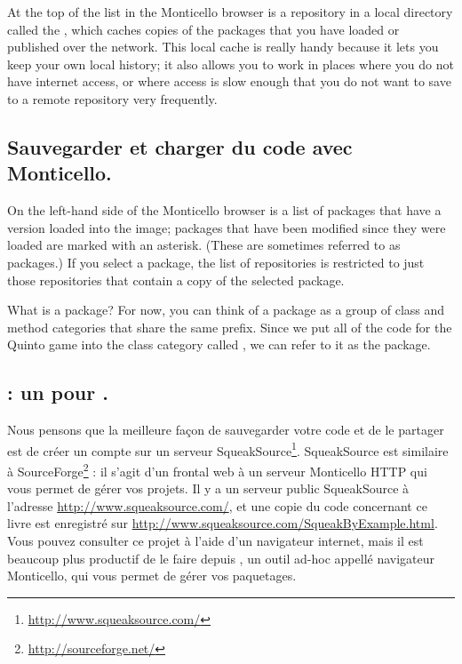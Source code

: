 \documentclass[a4paper,10pt,twoside]{book}
\begin{document}
At the top of the list in the Monticello browser is a repository in a local directory called the , which caches copies of the packages that you have loaded or published over the network. This local cache is really handy because it lets you keep your own local history; it also allows you to work in places where you do not have internet access, or where access is slow enough that you do not want to save to a remote repository very frequently.


\subsection{Sauvegarder et charger du code avec Monticello.}
On the left-hand side of the Monticello browser is a list of packages that have a version loaded into the image; packages that have been modified since they were loaded are marked with an asterisk.  (These are sometimes referred to as  packages.)  If you select a package, the list of repositories is restricted to just those repositories that contain a copy of the selected package.

What is a package?  For now, you can think of a package as a group of  class and method categories that share the same prefix.  Since we put all of the code for the Quinto game into the class category called , we can refer to it as the  package.


\subsection{: un  pour \squeak.} 
Nous pensons que la meilleure façon de sauvegarder votre code et de le partager est de créer un compte sur un serveur SqueakSource\footnote{\url{http://www.squeaksource.com/}}.
SqueakSource est similaire à SourceForge\footnote{\url{http://sourceforge.net/}} : il s'agit d'un frontal web à un serveur Monticello HTTP qui vous permet de gérer vos projets.
Il y a un serveur public SqueakSource à l'adresse \url{http://www.squeaksource.com/}, et une copie du code concernant ce livre est enregistré sur \url{http://www.squeaksource.com/SqueakByExample.html}. Vous pouvez consulter ce projet à l'aide d'un navigateur internet, mais il est beaucoup plus productif de le faire depuis \squeak, un outil ad-hoc appellé navigateur Monticello, qui vous permet de gérer vos paquetages.
\end{document}
